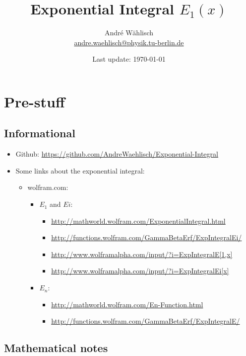 \documentclass[bibliography=totocnumbered]{scrartcl}
\title{Exponential Integral $E_1\left(x\right)$}
\author{André Wählisch\\\href{mailto:andre.waehlisch@physik.tu-berlin.de}{andre.waehlisch@physik.tu-berlin.de}}
\date{Last update: \today}
\begin{document}
	\maketitle
	\tableofcontents
	\clearpage
	
	\section{Pre-stuff}
	
	\subsection{Informational}
	
	\begin{itemize}
		\item Github: \url{https://github.com/AndreWaehlisch/Exponential-Integral}
		\item Some links about the exponential integral:
		\begin{itemize}
			\item wolfram.com:
			\begin{itemize}
				\item $E_1$ and $Ei$:
				\begin{itemize}
					\item \url{http://mathworld.wolfram.com/ExponentialIntegral.html}
					\item \url{http://functions.wolfram.com/GammaBetaErf/ExpIntegralEi/}
					\item \url{http://www.wolframalpha.com/input/?i=ExpIntegralE[1,x]}
					\item \url{http://www.wolframalpha.com/input/?i=ExpIntegralEi[x]}
				\end{itemize}
				\item $E_n$:
				\begin{itemize}
					\item \url{http://mathworld.wolfram.com/En-Function.html}
					\item \url{http://functions.wolfram.com/GammaBetaErf/ExpIntegralE/}
				\end{itemize}
			\end{itemize}
		\end{itemize}
	\end{itemize}
	
	\subsection{Mathematical notes}
	
\end{document}
